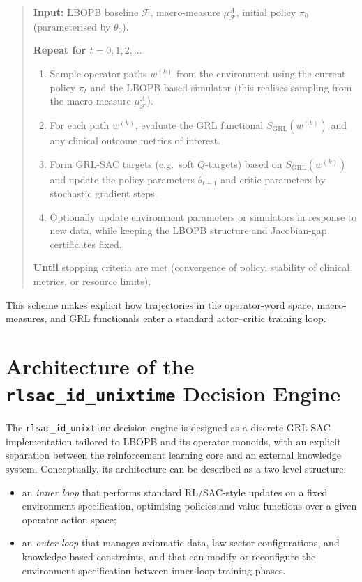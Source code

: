 \documentclass[11pt]{book}
\theoremstyle{plain}
\theoremstyle{definition}
\theoremstyle{remark}
\begin{document}
\begin{quote}
\textbf{Input:} LBOPB baseline $\mathcal{F}$, macro-measure
$\mu_{\mathcal{F}}^A$, initial policy $\pi_0$ (parameterised by
$\theta_0$).

\textbf{Repeat for $t=0,1,2,\dots$}
\begin{enumerate}
  \item Sample operator paths $w^{(k)}$ from the environment using the
        current policy $\pi_t$ and the LBOPB-based simulator (this
        realises sampling from the macro-measure $\mu_{\mathcal{F}}^A$).
  \item For each path $w^{(k)}$, evaluate the GRL functional
        $S_{\mathrm{GRL}}(w^{(k)})$ and any clinical outcome metrics of
        interest.
  \item Form GRL-SAC targets (e.g.\ soft $Q$-targets) based on
        $S_{\mathrm{GRL}}(w^{(k)})$ and update the policy parameters
        $\theta_{t+1}$ and critic parameters by stochastic gradient
        steps.
  \item Optionally update environment parameters or simulators in
        response to new data, while keeping the LBOPB structure and
        Jacobian-gap certificates fixed.
\end{enumerate}
\textbf{Until} stopping criteria are met (convergence of policy,
stability of clinical metrics, or resource limits).
\end{quote}

This scheme makes explicit how trajectories in the operator-word space,
macro-measures, and GRL functionals enter a standard actor--critic
training loop.

\section{Architecture of the \texttt{rlsac\_id\_unixtime} Decision Engine}


The \texttt{rlsac\_id\_unixtime} decision engine is designed as a
discrete GRL-SAC implementation tailored to LBOPB and its operator
monoids, with an explicit separation between the reinforcement learning
core and an external knowledge system. Conceptually, its architecture
can be described as a two-level structure:

\begin{itemize}
  \item an \emph{inner loop} that performs standard RL/SAC-style
        updates on a fixed environment specification, optimising
        policies and value functions over a given operator action
        space;
  \item an \emph{outer loop} that manages axiomatic data, law-sector
        configurations, and knowledge-based constraints, and that can
        modify or reconfigure the environment specification between
        inner-loop training phases.
\end{itemize}
\end{document}

